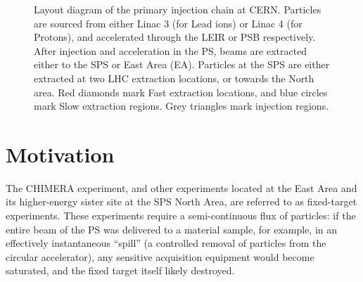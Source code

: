 \documentclass[11pt]{report}
\begin{document}
\begin{figure}
  \caption{Layout diagram of the primary injection chain at CERN. Particles are sourced from either Linac 3 (for Lead ions) or Linac 4 (for Protons), and accelerated through the LEIR or PSB respectively. After injection and acceleration in the PS, beams are extracted either to the SPS or East Area (EA). Particles at the SPS are either extracted at two LHC extraction locations, or towards the North area. Red diamonds mark Fast extraction locations, and blue circles mark Slow extraction regions. Grey triangles mark injection regions.}\label{fig:chain}
\end{figure}

\section{Motivation}\label{sec:motivation}

The CHIMERA experiment, and other experiments located at the East Area and its higher-energy sister site at the SPS North Area, are referred to as fixed-target experiments. These experiments require a semi-continuous flux of particles: if the entire beam of the PS was delivered to a material sample, for example, in an effectively instantaneous ``spill'' (a controlled removal of particles from the circular accelerator), any sensitive acquisition equipment would become saturated, and the fixed target itself likely destroyed.
\end{document}
